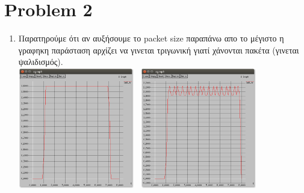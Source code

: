 \documentclass{article}
\begin{document}
\section*{Problem 2}
\begin{enumerate}
\item %
Παρατηρούμε ότι αν αυξήσουμε το packet size παραπάνω απο το μέγιστο η γραφηκη παράσταση αρχίζει να γινεται τριγωνική γιατί χάνονται πακέτα (γινεται ψαλιδισμός). 
\\
\includegraphics[witdh=200,height=200]{xgraph1.png} \
\includegraphics[witdh=200,height=200]{xgraph2000.png}

\end{enumerate}
\end{document}
